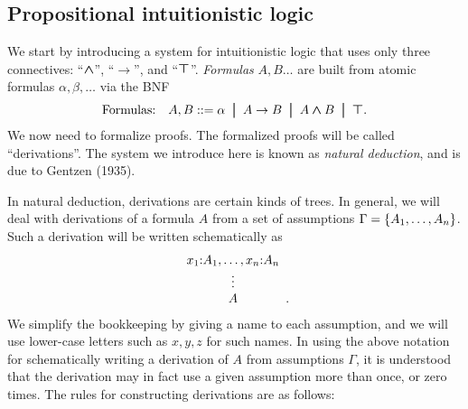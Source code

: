\documentclass{article}
\begin{document}
\subsection{Propositional intuitionistic logic}
\label{subsec-proplogic}

We start by introducing a system for intuitionistic logic that uses
only three connectives: ``$\mathbin{\textrm{\rm\boldmath $\wedge$}}$'', ``$\to$'', and ``$\textrm{\rm\boldmath $\top$}$''.
{\em Formulas} $A,B\ldots$ are built from atomic formulas
$\alpha,\beta,\ldots$ via the BNF
\[ \mbox{Formulas:}\ssep A,B \bnf \alpha \bor A\to B\bor A\cand
B\bor\ctrue.
\]
We now need to formalize proofs. The formalized proofs will be called
``derivations''. The system we introduce here is known as {\em natural
  deduction}, and is due to Gentzen (1935).

In natural deduction, derivations are certain kinds of trees. In
general, we will deal with derivations of a formula $A$ from a
set of assumptions $\Gamma=\{A_1,\ldots,A_n\}$. Such a derivation will
be written schematically as
\[  \mbox{$\begin{array}[b]{c}x_1{:}A_1,\ldots,x_n{:}A_n\\\vdots\\A\end{array}$}.
\]
We simplify the bookkeeping by giving a name to each assumption, and
we will use lower-case letters such as $x,y,z$ for such names.
In using the above notation for schematically writing a derivation of
$A$ from assumptions $\Gamma$, it is understood that the derivation
may in fact use a given assumption more than once, or zero times.
The rules for constructing derivations are as follows:
\end{document}
